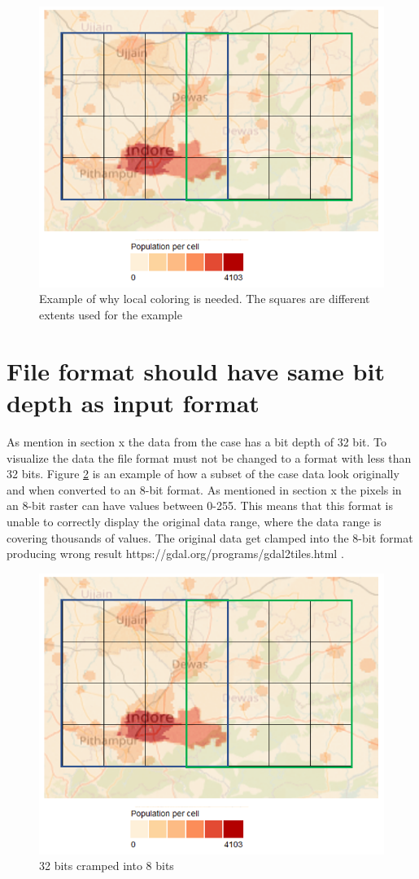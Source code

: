 \begin{figure} [H]
	\centering
	\includegraphics[width=.8\textwidth]{Pictures/WhyColorLocallyMap}
	\caption{Example of why local coloring is needed. The squares are different extents used for the example}
	\label{WhyColorLocallyMap}
\end{figure}

\section{File format should have same bit depth as input format}
As mention in section x the data from the case has a bit depth of 32 bit. To visualize the data the file format must not be changed to a format with less than 32 bits. Figure \ref{WhyColorLocallyMap} is an example of how a subset of the case data look originally and when converted to an 8-bit format. As mentioned in section x the pixels in an 8-bit raster can have values between 0-255. This means that this format is unable to correctly display the original data range, where the data range is covering thousands of values. The original data get clamped into the 8-bit format producing wrong result
https://gdal.org/programs/gdal2tiles.html .
 
 \begin{figure} [H]
 	\centering
 	\includegraphics[width=.8\textwidth]{Pictures/WhyColorLocallyMap}
 	\caption{32 bits cramped into 8 bits}
 	\label{WhyColorLocallyMap}
 \end{figure}
 
